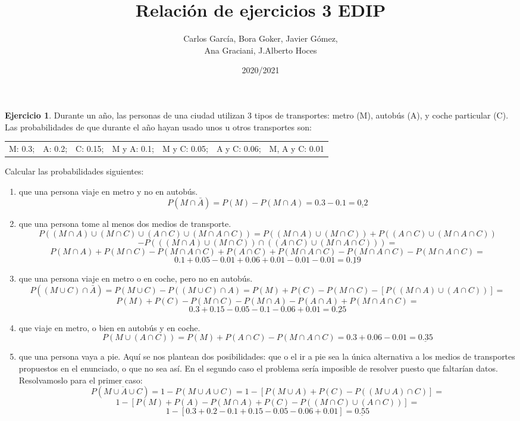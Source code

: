 \documentclass[a4paper, 12pt]{article}
\title{\textbf{Relación de ejercicios 3 EDIP}}
\author{Carlos García, Bora Goker, Javier Gómez,  \\ Ana Graciani, J.Alberto Hoces}
\date{2020/2021}
\theoremstyle{definition}
\newtheorem{ej}{Ejercicio}
\begin{document}
\maketitle

\begin{ej}
Durante un año, las personas de una ciudad utilizan 3 tipos de transportes: metro (M), autobús (A), y coche particular (C). Las probabilidades de que durante el año hayan usado unos u otros transportes son:

\medskip

\begin{tabular}{c c c c c c c}
	M: 0.3; & A: 0.2; & C: 0.15; & M y A: 0.1; & M y C: 0.05; & A y C: 0.06; & M, A y C: 0.01
\end{tabular} 

\medskip

Calcular las probabilidades siguientes:
\begin{enumerate}[label=\textit{\alph*)}]
	\item que una persona viaje en metro y no en autobús.
\[
	P(M \cap \bar{A}) = P(M) - P(M \cap A) = 0.3 - 0.1 = \underline{0.2}
\]
	\item que una persona tome al menos dos medios de transporte.
\[
	P((M \cap A) \cup (M \cap C) \cup (A \cap C) \cup (M \cap A \cap C)) = P((M \cap A) \cup (M \cap C)) + P((A \cap C) \cup (M \cap A \cap C)) 
\]
\[
	- P(((M \cap A) \cup (M \cap C)) \cap ((A \cap C) \cup (M \cap A \cap C))) =
\]
\[
	P(M \cap A) + P(M \cap C) - P(M \cap A \cap C) + P(A \cap C) + P(M \cap A \cap C) - P(M \cap A \cap C) - P(M \cap A \cap C) =
\]
\[
	0.1 + 0.05 - 0.01 + 0.06 + 0.01 - 0.01 - 0.01 = \underline{0.19}
\]
	\item que una persona viaje en metro o en coche, pero no en autobús.
\[
	P((M \cup C) \cap \bar{A}) = P(M \cup C) - P((M \cup C) \cap A) = P(M) + P(C) - P(M \cap C) - [P((M \cap A) \cup (A \cap C))] =
\]
\[
	P(M) + P(C) - P(M \cap C) - P(M \cap A) - P(A \cap A) + P(M \cap A \cap C) =
\]
\[
	0.3 + 0.15 - 0.05 - 0.1 - 0.06 + 0.01 = \underline{0.25}
\]
	\item que viaje en metro, o bien en autobús y en coche.
\[
	P(M \cup (A \cap C)) = P(M) + P(A \cap C) - P(M \cap A \cap C) = 0.3 + 0.06 - 0.01 = \underline{0.35}
\]
	\item que una persona vaya a pie.
	Aquí se  nos plantean dos posibilidades: que o el ir a pie sea la única alternativa a los medios de transportes propuestos en el enunciado, o que no sea así. En el segundo caso el problema sería imposible de resolver puesto que faltarían datos. Resolvamoslo para el primer caso:
\[
	P(\overline{M \cup A \cup C}) = 1 - P(M \cup A \cup C) = 1 - [P(M \cup A) + P(C) - P((M \cup A) \cap C)] = 
\]
\[
	1 - [P(M) + P(A) - P(M \cap A) + P(C) - P((M \cap C) \cup (A \cap C))] =
\]
\[
	1 - [0.3 + 0.2 - 0.1 + 0.15 - 0.05 - 0.06 + 0.01] = \underline{0.55}
\]
\end{enumerate}

\end{ej}
\end{document}
